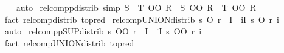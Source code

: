 \begin{isabellebody}
%
\isadelimproof
\ \ %
\endisadelimproof
%
\isatagproof
{}\isamarkupfalse%
\ auto%
\endisatagproof
{\isafoldproof}%
%
\isadelimproof
\isanewline
%
\endisadelimproof
\isanewline
{}\isamarkupfalse%
\ relcompp{\isacharunderscore}{\kern0pt}distrib{}\ {\isacharbrackleft}{\kern0pt}simp{\isacharbrackright}{\kern0pt}{\isacharcolon}{\kern0pt}\ {\isachardoublequoteopen}{\isacharparenleft}{\kern0pt}S\ {\isasymsqunion}\ T{\isacharparenright}{\kern0pt}\ OO\ R\ {\isacharequal}{\kern0pt}\ S\ OO\ R\ {\isasymsqunion}\ T\ OO\ R{\isachardoublequoteclose}\isanewline
%
\isadelimproof
\ \ %
\endisadelimproof
%
\isatagproof
{}\isamarkupfalse%
\ {\isacharparenleft}{\kern0pt}fact\ relcomp{\isacharunderscore}{\kern0pt}distrib{}\ {\isacharbrackleft}{\kern0pt}to{\isacharunderscore}{\kern0pt}pred{\isacharbrackright}{\kern0pt}{\isacharparenright}{\kern0pt}%
\endisatagproof
{\isafoldproof}%
%
\isadelimproof
\isanewline
%
\endisadelimproof
\isanewline
{}\isamarkupfalse%
\ relcomp{\isacharunderscore}{\kern0pt}UNION{\isacharunderscore}{\kern0pt}distrib{\isacharcolon}{\kern0pt}\ {\isachardoublequoteopen}s\ O\ {\isasymUnion}{\isacharparenleft}{\kern0pt}r\ {\isacharbackquote}{\kern0pt}\ I{\isacharparenright}{\kern0pt}\ {\isacharequal}{\kern0pt}\ {\isacharparenleft}{\kern0pt}{\isasymUnion}i{\isasymin}I{\isachardot}{\kern0pt}\ s\ O\ r\ i{\isacharparenright}{\kern0pt}\ {\isachardoublequoteclose}\isanewline
%
\isadelimproof
\ \ %
\endisadelimproof
%
\isatagproof
{}\isamarkupfalse%
\ auto%
\endisatagproof
{\isafoldproof}%
%
\isadelimproof
\isanewline
%
\endisadelimproof
\isanewline
{}\isamarkupfalse%
\ relcompp{\isacharunderscore}{\kern0pt}SUP{\isacharunderscore}{\kern0pt}distrib{\isacharcolon}{\kern0pt}\ {\isachardoublequoteopen}s\ OO\ {\isasymSqunion}{\isacharparenleft}{\kern0pt}r\ {\isacharbackquote}{\kern0pt}\ I{\isacharparenright}{\kern0pt}\ {\isacharequal}{\kern0pt}\ {\isacharparenleft}{\kern0pt}{\isasymSqunion}i{\isasymin}I{\isachardot}{\kern0pt}\ s\ OO\ r\ i{\isacharparenright}{\kern0pt}{\isachardoublequoteclose}\isanewline
%
\isadelimproof
\ \ %
\endisadelimproof
%
\isatagproof
{}\isamarkupfalse%
\ {\isacharparenleft}{\kern0pt}fact\ relcomp{\isacharunderscore}{\kern0pt}UNION{\isacharunderscore}{\kern0pt}distrib\ {\isacharbrackleft}{\kern0pt}to{\isacharunderscore}{\kern0pt}pred{\isacharbrackright}{\kern0pt}{\isacharparenright}{\kern0pt}%
\endisatagproof
{\isafoldproof}%
%
\isadelimproof
\isanewline
%
\endisadelimproof
\ \ \ \ \isanewline
{}\isamarkupfalse%

\end{isabellebody}

